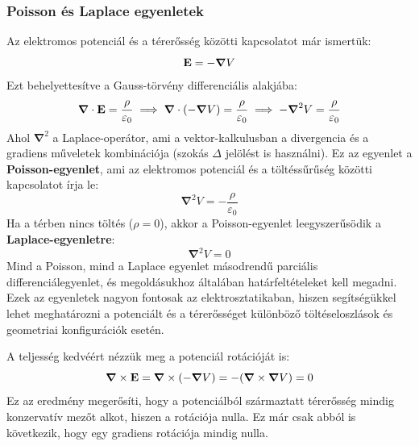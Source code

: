 \documentclass[a4paper,12pt]{article}
\begin{document}
\subsubsection{Poisson és Laplace egyenletek}
Az elektromos potenciál és a térerősség közötti kapcsolatot már ismertük:
\begin{equation}
    \bold{E} = - \boldsymbol{\nabla} V
\end{equation}
Ezt behelyettesítve a Gauss-törvény differenciális alakjába:
\begin{equation}
    \boldsymbol{\nabla} \cdot \bold{E} = \frac{\rho}{\varepsilon_0} \implies \boldsymbol{\nabla} \cdot (- \boldsymbol{\nabla} V) = \frac{\rho}{\varepsilon_0} \implies - \boldsymbol{\nabla}^2 V = \frac{\rho}{\varepsilon_0}
\end{equation}
Ahol $\boldsymbol{\nabla}^2$ a Laplace-operátor, ami a vektor-kalkulusban a divergencia és a gradiens műveletek kombinációja (szokás $\Delta$ jelölést is használni). Ez az egyenlet a \textbf{Poisson-egyenlet}, ami az elektromos potenciál és a töltéssűrűség közötti kapcsolatot írja le:
\begin{equation}
    \boxed{\boldsymbol{\nabla}^2 V = - \frac{\rho}{\varepsilon_0}}
\end{equation}
Ha a térben nincs töltés ($\rho = 0$), akkor a Poisson-egyenlet leegyszerűsödik a \textbf{Laplace-egyenletre}:
\begin{equation}
    \boxed{\boldsymbol{\nabla}^2 V = 0}
\end{equation}
Mind a Poisson, mind a Laplace egyenlet másodrendű parciális differenciálegyenlet, és megoldásukhoz általában határfeltételeket kell megadni. Ezek az egyenletek nagyon fontosak az elektrosztatikaban, hiszen segítségükkel lehet meghatározni a potenciált és a térerősséget különböző töltéseloszlások és geometriai konfigurációk esetén.

A teljesség kedvéért nézzük meg a potenciál rotációját is:
\begin{equation}
    \boldsymbol{\nabla} \times \bold{E} = \boldsymbol{\nabla} \times (- \boldsymbol{\nabla} V) = - (\boldsymbol{\nabla} \times \boldsymbol{\nabla} V) = 0
\end{equation}
Ez az eredmény megerősíti, hogy a potenciálból származtatt térerősség mindig konzervatív mezőt alkot, hiszen a rotációja nulla. Ez már csak abból is következik, hogy egy gradiens rotációja mindig nulla.
\end{document}

